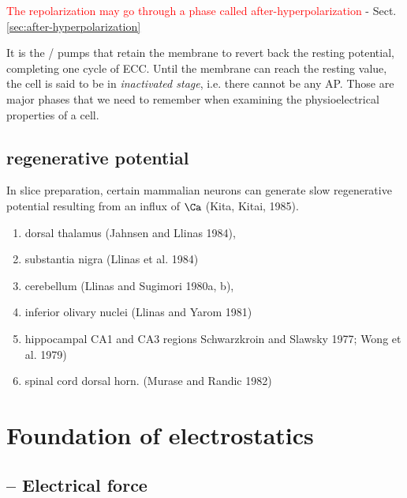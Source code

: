 \textcolor{red}{The repolarization may go through a phase called
after-hyperpolarization} - Sect.\ref{sec:after-hyperpolarization}

It is the / pumps that retain the membrane to revert back the
resting potential, completing one cycle of ECC. Until the membrane can reach the
resting value, the cell is said to be in {\it inactivated stage}, i.e. there
cannot be any AP.
Those are major phases that we need to remember when examining the
physioelectrical properties of a cell.


\subsection{regenerative potential}
\label{sec:regenerative-potential}
\label{sec:action-potential-regenerative}


In slice preparation, certain mammalian neurons can generate slow regenerative
potential resulting from an influx of $\Ca$ (Kita, Kitai, 1985).
\begin{enumerate}
  \item dorsal thalamus  (Jahnsen and Llinas  1984),
  
  \item substantia nigra (Llinas et al. 1984)
  
  \item cerebellum (Llinas and Sugimori 1980a, b),
  
  \item inferior olivary nuclei (Llinas  and Yarom 1981)
   
  \item hippocampal CA1 and CA3 regions Schwarzkroin and Slawsky 1977; Wong et
  al. 1979)
  
  \item spinal cord dorsal horn. (Murase and Randic 1982)

\end{enumerate}


\section{Foundation of  electrostatics}
\label{sec:found-of-electr}

\subsection{-- Electrical force}
\label{sec:electrical-force}


